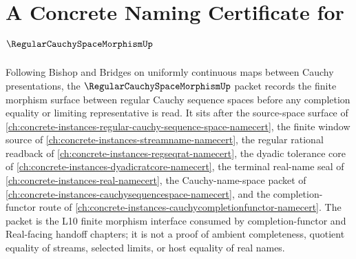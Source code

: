 \chapter{A Concrete Naming Certificate for $\RegularCauchySpaceMorphismUp$}
\label{ch:concrete-instances-regular-cauchy-space-morphism-namecert}

Following Bishop and Bridges on uniformly continuous maps between Cauchy presentations, the $\RegularCauchySpaceMorphismUp$ packet records the finite morphism surface between regular Cauchy sequence spaces before any completion equality or limiting representative is read. It sits after the source-space surface of \autoref{ch:concrete-instances-regular-cauchy-sequence-space-namecert}, the finite window source of \autoref{ch:concrete-instances-streamname-namecert}, the regular rational readback of \autoref{ch:concrete-instances-regseqrat-namecert}, the dyadic tolerance core of \autoref{ch:concrete-instances-dyadicratcore-namecert}, the terminal real-name seal of \autoref{ch:concrete-instances-real-namecert}, the Cauchy-name-space packet of \autoref{ch:concrete-instances-cauchysequencespace-namecert}, and the completion-functor route of \autoref{ch:concrete-instances-cauchycompletionfunctor-namecert}. The packet is the L10 finite morphism interface consumed by completion-functor and Real-facing handoff chapters; it is not a proof of ambient completeness, quotient equality of streams, selected limits, or host equality of real names.


